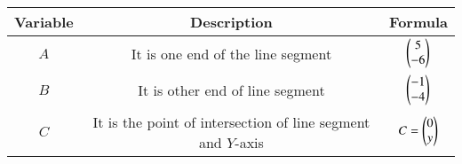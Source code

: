 \begin{center}
    \begin{tabular}{|c|c|c|} 
        \hline
            \textbf{Variable} & \textbf{Description} & \textbf{Formula} \\ 
        \hline
            $A$   & It is one end of the line segment & $\begin{pmatrix}5 \\ -6\end{pmatrix}$ \\ 
        \hline
            $B$   & It is other end of line segment &  $\begin{pmatrix}-1\\-4\end{pmatrix}$\\ 
        \hline
            $C$   & It is the point of intersection of line segment and $Y$-axis & $C  = \begin{pmatrix}0\\y\end{pmatrix}$\\ 
        \hline
        
    \end{tabular}
\end{center}  
